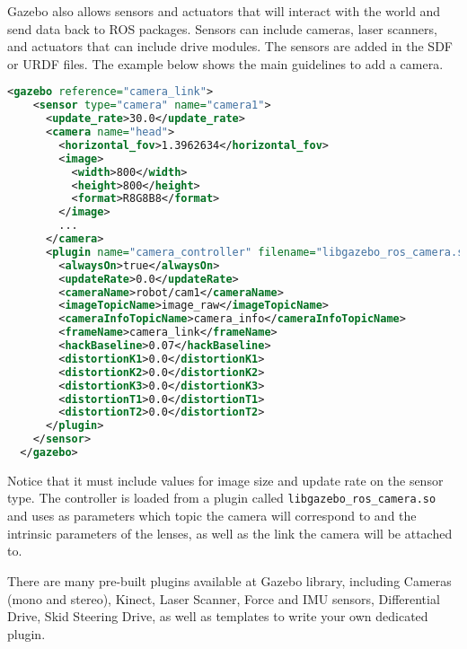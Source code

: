 Gazebo also allows sensors and actuators that will interact with the world and send data back to ROS packages. Sensors can include cameras, laser scanners, and actuators that can include drive modules. The sensors are added in the SDF or URDF files. The example below shows the main guidelines to add a camera.

\begin{lstlisting}[caption=Camera Description., language=XML]
  <gazebo reference="camera_link">
    <sensor type="camera" name="camera1">
      <update_rate>30.0</update_rate>
      <camera name="head">
        <horizontal_fov>1.3962634</horizontal_fov>
        <image>
          <width>800</width>
          <height>800</height>
          <format>R8G8B8</format>
        </image>
        ...
      </camera>
      <plugin name="camera_controller" filename="libgazebo_ros_camera.so">
        <alwaysOn>true</alwaysOn>
        <updateRate>0.0</updateRate>
        <cameraName>robot/cam1</cameraName>
        <imageTopicName>image_raw</imageTopicName>
        <cameraInfoTopicName>camera_info</cameraInfoTopicName>
        <frameName>camera_link</frameName>
        <hackBaseline>0.07</hackBaseline>
        <distortionK1>0.0</distortionK1>
        <distortionK2>0.0</distortionK2>
        <distortionK3>0.0</distortionK3>
        <distortionT1>0.0</distortionT1>
        <distortionT2>0.0</distortionT2>
      </plugin>
    </sensor>
  </gazebo>
\end{lstlisting}

Notice that it must include values for image size and update rate on the sensor type. The controller is loaded from a plugin called \texttt{libgazebo\_ros\_camera.so} and uses as parameters which topic the camera will correspond to and the intrinsic parameters of the lenses, as well as the link the camera will be attached to.

There are many pre-built plugins available at Gazebo library, including Cameras (mono and stereo), Kinect, Laser Scanner, Force and IMU sensors, Differential Drive, Skid Steering Drive, as well as templates to write your own dedicated plugin.



